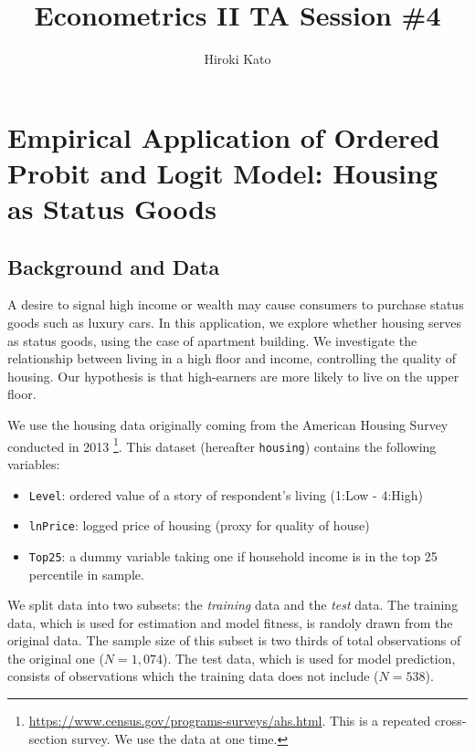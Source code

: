 \documentclass[
  12pt,
]{article}
\title{Econometrics II TA Session \#4}
\author{Hiroki Kato}
\date{}
\providecommand{\tightlist}{%
  \setlength{\itemsep}{0pt}\setlength{\parskip}{0pt}}
\begin{document}
\maketitle

\hypertarget{empirical-application-of-ordered-probit-and-logit-model-housing-as-status-goods}{%
\section{Empirical Application of Ordered Probit and Logit Model:
Housing as Status
Goods}\label{empirical-application-of-ordered-probit-and-logit-model-housing-as-status-goods}}

\hypertarget{background-and-data}{%
\subsection{Background and Data}\label{background-and-data}}

A desire to signal high income or wealth may cause consumers to purchase
status goods such as luxury cars. In this application, we explore
whether housing serves as status goods, using the case of apartment
building. We investigate the relationship between living in a high floor
and income, controlling the quality of housing. Our hypothesis is that
high-earners are more likely to live on the upper floor.

We use the housing data originally coming from the American Housing
Survey conducted in 2013 \footnote{\url{https://www.census.gov/programs-surveys/ahs.html}.
  This is a repeated cross-section survey. We use the data at one time.}.
This dataset (hereafter \texttt{housing}) contains the following
variables:

\begin{itemize}
\tightlist
\item
  \texttt{Level}: ordered value of a story of respondent's living (1:Low
  - 4:High)
\item
  \texttt{lnPrice}: logged price of housing (proxy for quality of house)
\item
  \texttt{Top25}: a dummy variable taking one if household income is in
  the top 25 percentile in sample.
\end{itemize}

We split data into two subsets: the \emph{training} data and the
\emph{test} data. The training data, which is used for estimation and
model fitness, is randoly drawn from the original data. The sample size
of this subset is two thirds of total observations of the original one
(\(N = 1,074\)). The test data, which is used for model prediction,
consists of observations which the training data does not include
(\(N = 538\)).
\end{document}
